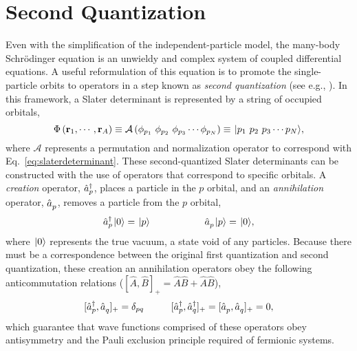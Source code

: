 \documentclass[thesis.tex]{subfiles}
\begin{document}
\section{Second Quantization}
Even with the simplification of the independent-particle model, the many-body Schr\"{o}dinger equation is an unwieldy and complex system of coupled differential equations.  A useful reformulation of this equation is to promote the single-particle orbits to operators in a step known as \textit{second quantization} (see e.g., \cite{SHAVITT2009,FETTER2003043536}).  In this framework, a Slater determinant is represented by a string of occupied orbitals,
\begin{equation}
  \Phi\left(\mathbf{r}_{1},\cdots,\mathbf{r}_{A}\right) \equiv \mathcal{A}\left(\phi_{p_{1}}\ \phi_{p_{2}}\ \phi_{p_{3}} \cdots \phi_{p_{N}}\right) \equiv \hspace{1pt}\lvert p_{1}\ p_{2}\ p_{3} \cdots p_{N} \rangle,
\end{equation}
where $\mathcal{A}$ represents a permutation and normalization operator to correspond with Eq.\ \eqref{eq:slaterdeterminant}.  These second-quantized Slater determinants can be constructed with the use of operators that correspond to specific orbitals.  A \textit{creation} operator, $\hat{a}_{p}^{\dagger}$, places a particle in the $p$ orbital, and an \textit{annihilation} operator, $\hat{a}_{p}^{}$, removes a particle from the $p$ orbital,
\begin{equation}
  \hat{a}_{p}^{\dagger}\hspace{1pt}\lvert 0 \rangle = \hspace{1pt}\lvert p \rangle \hspace{2cm} \hat{a}_{p}^{}\hspace{1pt}\lvert p \rangle = \hspace{1pt}\lvert 0 \rangle,
\end{equation}
where $\hspace{1pt}\lvert 0 \rangle$ represents the true vacuum, a state void of any particles.  Because there must be a correspondence between the original first quantization and second quantization, these creation an annihilation operators obey the following anticommutation relations ($[ \hat{A},\hat{B} ]_{+} = \hat{A}\hat{B} + \hat{A}\hat{B}$),
\begin{equation} \label{eq:anticommutation}
  [ \hat{a}_{p}^{\dagger},\hat{a}_{q}^{} ]_{+} = \delta_{pq} \hspace{1cm} [ \hat{a}_{p}^{\dagger},\hat{a}_{q}^{\dagger} ]_{+} = [ \hat{a}_{p}^{},\hat{a}_{q}^{} ]_{+} = 0,
\end{equation}
which guarantee that wave functions comprised of these operators obey antisymmetry and the Pauli exclusion principle required of fermionic systems.
\end{document}
